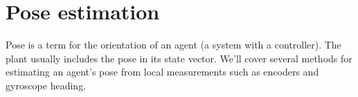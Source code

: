 
\chapter{Pose estimation}
\label{ch:pose_estimation}

Pose is a term for the orientation of an \gls{agent} (a system with a
controller). The plant usually includes the pose in its state vector. We'll
cover several methods for estimating an agent's pose from local measurements
such as encoders and gyroscope heading.

\renewcommand*{\chapterpath}{\partpath/pose-estimation}



